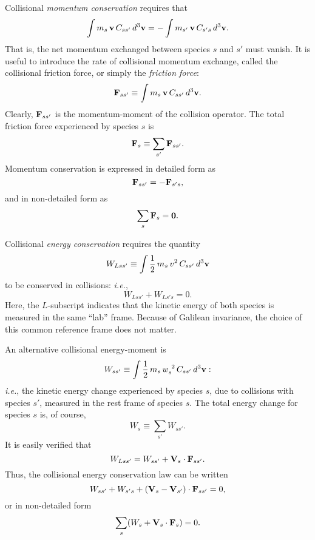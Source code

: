 Collisional {\em momentum conservation} requires that
\begin{equation}
\int m_s\,{\bf v}\,C_{ss'}\,d^3{\bf v} = - \int m_{s'}\,{\bf v}\,C_{s's}\,d^3{\bf v}.
\end{equation}
That is, the net momentum exchanged between species $s$ and $s'$ must vanish.
It is useful to introduce the rate of collisional momentum exchange, called the
collisional friction force, or simply the {\em friction force}:
\begin{equation}
{\bf F}_{ss'}\equiv \int m_s\,{\bf v}\,C_{ss'}\,d^3{\bf v}.
\end{equation}
Clearly, ${\bf F}_{ss'}$ is the momentum-moment of the collision operator. 
The total friction force experienced by species $s$ is
\begin{equation}
{\bf F}_s \equiv \sum_{s'} {\bf F}_{ss'}.
\end{equation}
Momentum conservation is expressed in detailed form as
\begin{equation}
{\bf F}_{ss'} = -{\bf F}_{s's},
\end{equation}
and in non-detailed form as
\begin{equation}\label{e3.30}
\sum_s {\bf F}_s = {\bf 0}.
\end{equation}

Collisional {\em energy conservation}\/ requires the quantity
\begin{equation}
W_{Lss'} \equiv \int \frac{1}{2}\,m_s\,v^2\,C_{ss'}\,d^3{\bf v}
\end{equation}
to be conserved in collisions: {\em i.e.},
\begin{equation}
W_{Lss'} + W_{Ls's} =0.
\end{equation}
Here, the $L$-subscript indicates that the kinetic energy of both
species is measured in the same ``lab'' frame. Because of Galilean invariance,
the choice of this common reference frame does not matter.

An alternative collisional energy-moment is
\begin{equation}
W_{ss'} \equiv \int \frac{1}{2}\,m_s\,w_s^{~2}\,C_{ss'}\,d^3{\bf v}:
\end{equation}
{\em i.e.}, the kinetic energy change experienced by species $s$, due to
collisions with species $s'$, measured in the rest frame of species $s$.
The total energy change for species $s$ is, of course, 
\begin{equation}
W_s \equiv \sum_{s'} W_{ss'}.
\end{equation}
It is easily verified that
\begin{equation}
W_{Lss'} = W_{ss'} + {\bf V}_s\cdot{\bf F}_{ss'}.
\end{equation}
Thus, the collisional energy conservation law can be written
\begin{equation}
W_{ss'} +W_{s's} +({\bf V}_s-{\bf V}_{s'})\cdot {\bf F}_{ss'} = 0,
\end{equation} 
or in non-detailed form
\begin{equation}\label{e3.37}
\sum_s (W_s + {\bf V}_s\cdot{\bf F}_s) = 0.
\end{equation}

